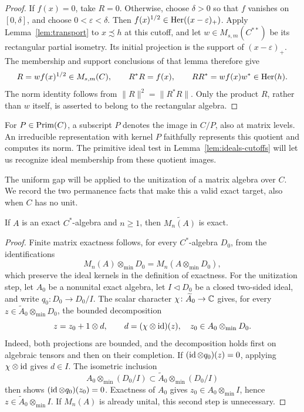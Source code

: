 \begin{proof}
If \(f(x)=0\), take \(R=0\).  Otherwise, choose \(\delta>0\) so
that \(f\) vanishes on \([0,\delta]\), and choose
\(0<\varepsilon<\delta\).  Then
\(f(x)^{1/2}\in\operatorname{Her}((x-\varepsilon)_+)\).
Apply Lemma~\ref{lem:transport} to \(x\precsim h\) at this cutoff,
and let \(w\in M_{s,m}(C^{**})\) be its rectangular partial isometry.
Its initial projection is the support of \((x-\varepsilon)_+\).
The membership and support conclusions of that lemma therefore give
\[
 R=w f(x)^{1/2}\in M_{s,m}(C),\qquad
 R^*R=f(x),\qquad RR^*=w f(x)w^*\in\operatorname{Her}(h).
\]
The norm identity follows from \(\|R\|^2=\|R^*R\|\).
Only the product \(R\), rather than \(w\) itself, is asserted to
belong to the rectangular algebra.
\end{proof}

For \(P\in\operatorname{Prim}(C)\), a subscript \(P\) denotes the image in \(C/P\),
also at matrix levels.  An irreducible representation with kernel
\(P\) faithfully represents this quotient and computes its norm.
The primitive ideal test in Lemma~\ref{lem:ideals-cutoffs} will let us
recognize ideal membership from these quotient images.

The uniform gap will be applied to the unitization of a matrix algebra
over \(C\).  We record the two permanence facts that make this a valid
exact target, also when \(C\) has no unit.

\begin{lemma}
\label{lem:exact-matrix-unitization}
If \(A\) is an exact \(C^*\)-algebra and \(n\ge1\), then
\(\widetilde{M_n(A)}\) is exact.
\end{lemma}

\begin{proof}
Finite matrix exactness follows, for every \(C^*\)-algebra \(D_0\),
from the identifications
\[
 M_n(A)\otimes_{\min}D_0=M_n(A\otimes_{\min}D_0),
\]
which preserve the ideal kernels in the definition of exactness.
For the unitization step, let \(A_0\) be a nonunital exact algebra,
let \(I\triangleleft D_0\) be a closed two-sided ideal, and write
\(q_0\colon D_0\to D_0/I\).  The scalar character
\(\chi\colon\widetilde A_0\to\mathbb C\) gives, for every
\(z\in\widetilde A_0\otimes_{\min}D_0\), the bounded decomposition
\[
 z=z_0+1\otimes d,\qquad
 d=(\chi\otimes\operatorname{id})(z),\quad z_0\in A_0\otimes_{\min}D_0.
\]
Indeed, both projections are bounded, and the decomposition holds
first on algebraic tensors and then on their completion.  If
\((\operatorname{id}\otimes q_0)(z)=0\), applying \(\chi\otimes\operatorname{id}\) gives
\(d\in I\).  The isometric inclusion
\[
 A_0\otimes_{\min}(D_0/I)
 \subset\widetilde A_0\otimes_{\min}(D_0/I)
\]
then shows \((\operatorname{id}\otimes q_0)(z_0)=0\).  Exactness of \(A_0\) gives
\(z_0\in A_0\otimes_{\min}I\), hence
\(z\in\widetilde A_0\otimes_{\min}I\).  If \(M_n(A)\) is already
unital, this second step is unnecessary.
\end{proof}

